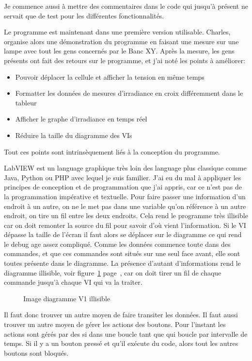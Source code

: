 \documentclass[12pt]{article}
\begin{document}
Je commence aussi à mettre des commentaires dans le code qui jusqu'à présent ne servait que de test pour les différentes fonctionnalités.

Le programme est maintenant dans une première version utilisable.  Charles, organise alors une démonstration du programme en faisant une mesure sur une lampe avec tout les gens concernés par le Banc XY.
Après la mesure, les gens présents ont fait des retours sur le programme, et j'ai noté les points à améliorer:
\begin{itemize}
	\item Pouvoir déplacer la cellule et afficher la tension en même temps
	\item Formatter les données de mesures d'irradiance en croix différemment dans le tableur
	\item Afficher le graphe d'irradiance en temps réel
	\item Réduire la taille du diagramme des VIs
\end{itemize}

Tout ces points sont intrinsèquement liés à la conception du programme.

LabVIEW est un language graphique très loin des language plus classique comme Java, Python ou PHP avec lequel je suis familier.
J'ai eu du mal à appliquer les principes de conception et de programmation que j'ai appris, car ce n'est pas de la programmation impérative et textuelle.
Pour faire passer une information d'un endroit à un autre, on ne le met pas dans une variable qu'on référence à un autre endroit, on tire un fil entre les deux endroits.
Cela rend le programme très illisible car on doit remonter la source du fil pour savoir d'où vient l'information.
Si le VI dépasse la taille de l'écran il faut alors se déplacer sur le diagramme ce qui rend le debug age assez compliqué.
Comme les données commence toute dans des commandes, et que ces commandes sont situés sur une seul face avant, elle sont toutes présente dans le diagramme.
La présence d'autant d'informations rend le diagramme illisible, voir figure~\ref{fig:diagrammeV1} page~\pageref{fig:diagrammeV1}, car on doit tirer un fil de chaque commande jusqu'à chaque VI qui va la traiter.

\begin{figure}[p]
	\centering
	\caption{Image diagramme V1 illisible}
	\label{fig:diagrammeV1}
\end{figure}


Il faut donc trouver un autre moyen de faire transiter les données.
Il faut aussi trouver un autre moyen de gérer les actions des boutons.
Pour l'instant les actions sont gérés par des si dans une boucle tant que qui boucle par intervalle de temps. Si il y a un bouton pressé et qu'il exécute du code, alors tout les autres boutons sont bloqués.
\end{document}
